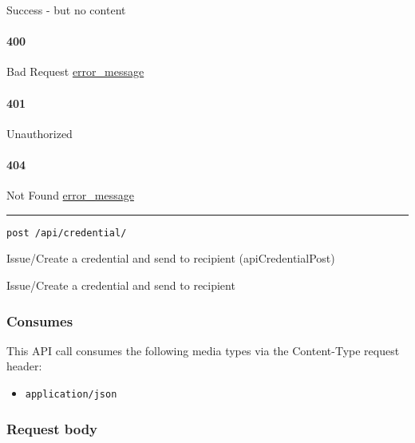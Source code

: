 Success - but no content \protect\hyperlink{}{}

\hypertarget{section-101}{%
\paragraph{400}\label{section-101}}

Bad Request \protect\hyperlink{error_message}{error\_message}

\hypertarget{section-102}{%
\paragraph{401}\label{section-102}}

Unauthorized \protect\hyperlink{}{}

\hypertarget{section-103}{%
\paragraph{404}\label{section-103}}

Not Found \protect\hyperlink{error_message}{error\_message}

\begin{center}\rule{0.5\linewidth}{\linethickness}\end{center}

\protect\hypertarget{apiCredentialPost}{}{}

\begin{verbatim}
post /api/credential/
\end{verbatim}

Issue/Create a credential and send to recipient ({apiCredentialPost})

Issue/Create a credential and send to recipient

\hypertarget{consumes-10}{%
\subsubsection{Consumes}\label{consumes-10}}

This API call consumes the following media types via the {Content-Type}
request header:

\begin{itemize}
\tightlist
\item
  \texttt{application/json}
\end{itemize}

\hypertarget{request-body-10}{%
\subsubsection{Request body}\label{request-body-10}}

